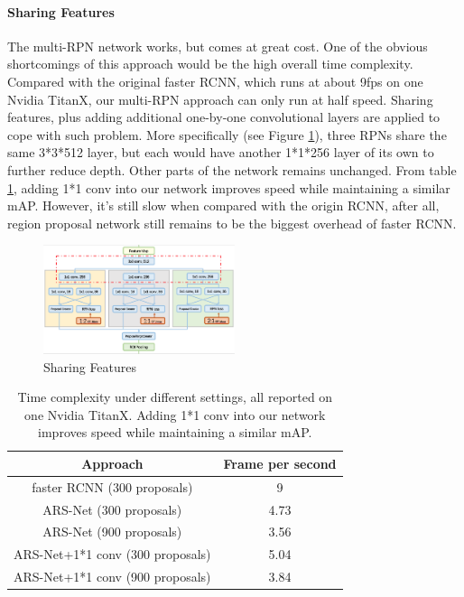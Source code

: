 \documentclass[10pt,twocolumn,letterpaper]{article}
\begin{document}
\paragraph{Sharing Features}
The multi-RPN network works, but comes at great cost. One of the obvious shortcomings of this approach would be the high overall time complexity. Compared with the original faster RCNN, which runs at about 9fps on one Nvidia TitanX, our multi-RPN approach can only run at half speed. Sharing features, plus adding additional one-by-one convolutional layers are applied to cope with such problem. More specifically (see Figure \ref{ARS_sh}), three RPNs share the same 3*3*512 layer, but each would have another 1*1*256 layer of its own to further reduce depth. Other parts of the network remains unchanged. From table \ref{table_fps}, adding 1*1 conv into our network improves speed while maintaining a similar mAP. However, it's still slow when compared with the origin RCNN, after all, region proposal network still remains to be the biggest overhead of faster RCNN.
    \begin{figure}[!htb]
    \includegraphics[width= 0.5\textwidth]{pic/ARS-archi-share.png}
    \caption{Sharing Features}
    \label{ARS_sh}
    \end{figure}

\begin{table}[ht]
\centering
\begin{tabular}{|c|c|}
\hline Approach & Frame per second \\
\hline faster RCNN (300 proposals) & 9 \\
\hline ARS-Net (300 proposals) & 4.73 \\
\hline ARS-Net (900 proposals) & 3.56 \\
\hline ARS-Net+1*1 conv (300 proposals) & 5.04 \\
\hline ARS-Net+1*1 conv (900 proposals) & 3.84 \\
\hline
\end{tabular}
\caption{Time complexity under different settings, all reported on one Nvidia TitanX. Adding 1*1 conv into our network improves speed while maintaining a similar mAP.}
\label{table_fps}
\end{table}
\end{document}
